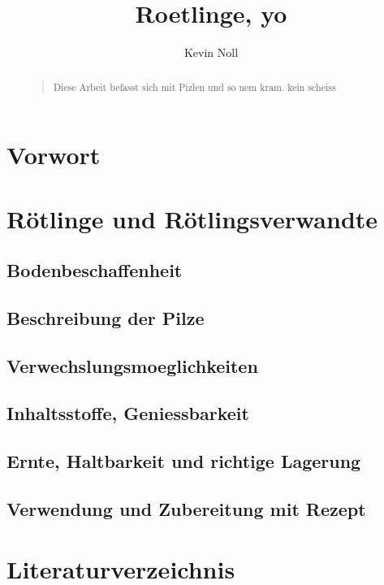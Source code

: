 \documentclass[a4paper,abstracton]{scrreprt}
\begin{document}
\author{Kevin Noll}
\subject{Pilze und so}
\title{Roetlinge, yo}
\publishers{htwsaar}
\maketitle
\tableofcontents

\begin{abstract}
\begin{quote}%
Diese Arbeit befasst sich mit Pizlen und so nem kram. kein scheiss
\end{quote} 
\end{abstract}

\chapter{Vorwort}

\chapter{Rötlinge und Rötlingsverwandte}
\section{Bodenbeschaffenheit}
\section{Beschreibung der Pilze}
\section{Verwechslungsmoeglichkeiten}
\section{Inhaltsstoffe, Geniessbarkeit}
\section{Ernte, Haltbarkeit und richtige Lagerung}
\section{Verwendung und Zubereitung mit Rezept}

\chapter{Literaturverzeichnis}
\end{document}
